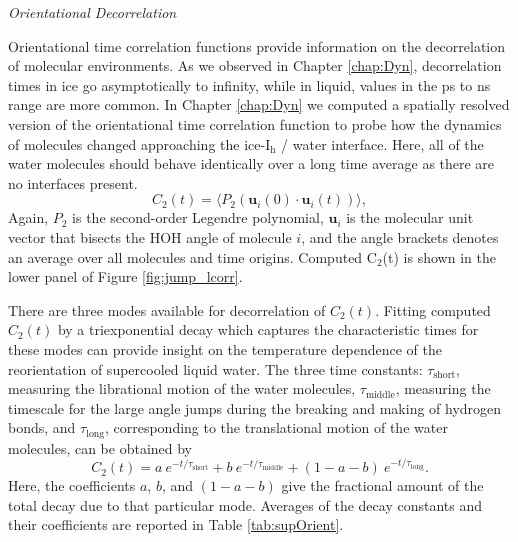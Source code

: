 \vspace{0.6cm}
\begin{flushleft}
\textit{Orientational Decorrelation}
\end{flushleft}

Orientational time correlation functions provide information on the
decorrelation of molecular environments. As we observed in Chapter
\ref{chap:Dyn}, decorrelation times in ice go asymptotically to
infinity, while in liquid, values in the ps to ns range are more
common. In Chapter \ref{chap:Dyn} we computed a spatially resolved
version of the orientational time correlation function to probe how
the dynamics of molecules changed approaching the ice-I$_\mathrm{h}$ /
water interface. Here, all of the water molecules should behave
identically over a long time average as there are no interfaces present.
\begin{equation}\label{C(t)}
  C_{2}(t)=\langle P_{2}(\mathbf{u}_i(0)\cdot \mathbf{u}_i(t))\rangle,
\end{equation}
Again, $P_2$ is the second-order Legendre polynomial, 
$\mathbf{u}_i$ is the molecular unit vector that bisects the HOH angle
of molecule $i$, and the angle brackets denotes an average over all
molecules and time origins. Computed C$_2$(t) is shown in the lower
panel of Figure \ref{fig:jump_lcorr}.

There are three modes available for decorrelation of $C_2(t)$. Fitting
computed $C_2(t)$ by a triexponential decay which captures the
characteristic times for these modes can provide insight on the
temperature dependence of the reorientation of supercooled liquid
water. The three time constants: $\tau_\mathrm{short}$, measuring the
librational motion of the water molecules, $\tau_\mathrm{middle}$,
measuring the timescale for the large angle jumps during the breaking
and making of hydrogen bonds, and $\tau_\mathrm{long}$, corresponding
to the translational motion of the water molecules, can be obtained
by\cite{Louden2013a}
\begin{equation}
  C_{2}(t) = a~e^{-t/\tau_\mathrm{short}} + b~e^{-t/\tau_\mathrm{middle}} + 
  (1-a-b)~e^{-t/\tau_\mathrm{long}}.
\label{eq:c2}
\end{equation}
Here, the coefficients $a$, $b$, and $(1-a-b)$ give the fractional
amount of the total decay due to that particular mode. Averages of the
decay constants and their coefficients are reported in Table
\ref{tab:supOrient}.


